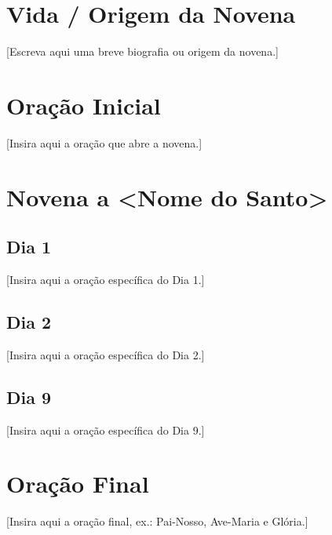 \documentclass[18pt]{article}
\author{Adaptado de publicação revisada}
\date{} %
\begin{document}
\tableofcontents
\thispagestyle{empty}

\newpage
\section*{Vida / Origem da Novena}
\begin{justify}
  [Escreva aqui uma breve biografia ou origem da novena.]
\end{justify}

\newpage
\section*{Oração Inicial}
\begin{justify}
  [Insira aqui a oração que abre a novena.]
\end{justify}

\newpage
\section{Novena a \textbf{<Nome do Santo>}}
\begin{justify}

\subsection{Dia 1}
[Insira aqui a oração específica do Dia 1.]

\subsection{Dia 2}
[Insira aqui a oração específica do Dia 2.]


\subsection{Dia 9}
[Insira aqui a oração específica do Dia 9.]

\end{justify}

\newpage
\section*{Oração Final}
\begin{justify}
  [Insira aqui a oração final, ex.: Pai-Nosso, Ave-Maria e Glória.]
\end{justify}
\end{document}
